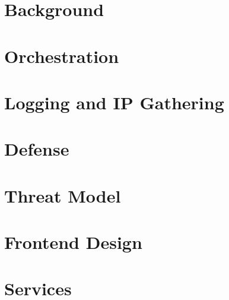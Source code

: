 \documentclass[letterpaper,twocolumn,10pt]{article}
\begin{document}
\section{Background}


\section{Orchestration}


\section{Logging and IP Gathering}


\section{Defense}


\section{Threat Model}


\section{Frontend Design}



\section{Services}


\end{document}
